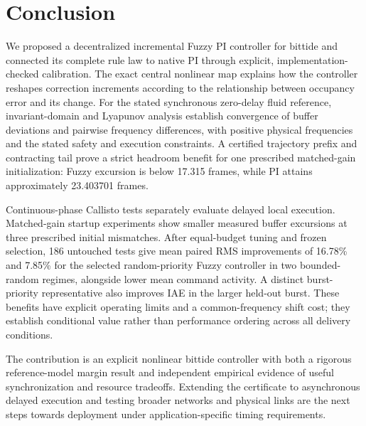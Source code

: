 \section{Conclusion}
\label{sec:conclusion}

We proposed a decentralized incremental Fuzzy PI controller for
bittide and connected its complete rule law to native PI through
explicit, implementation-checked calibration. The exact central
nonlinear map explains how the controller reshapes correction
increments according to the relationship between occupancy error
and its change. For the stated synchronous zero-delay fluid reference,
invariant-domain and Lyapunov analysis establish convergence of buffer
deviations and pairwise frequency differences, with positive physical
frequencies and the stated safety and execution constraints. A certified
trajectory prefix and contracting tail prove a strict headroom benefit
for one prescribed matched-gain initialization: Fuzzy excursion is
below 17.315 frames, while PI attains approximately 23.403701 frames.

Continuous-phase Callisto tests separately evaluate delayed local
execution. Matched-gain startup experiments show smaller measured
buffer excursions at three prescribed initial mismatches. After
equal-budget tuning and frozen selection, 186 untouched tests give
mean paired RMS improvements of 16.78\% and 7.85\% for the selected
random-priority Fuzzy controller in two bounded-random regimes,
alongside lower mean command activity. A distinct burst-priority
representative also improves IAE in the larger held-out burst.
These benefits have explicit operating limits and a common-frequency
shift cost; they establish conditional value rather than performance
ordering across all delivery conditions.

The contribution is an explicit nonlinear bittide controller with
both a rigorous reference-model margin result and independent
empirical evidence of useful synchronization and resource tradeoffs.
Extending the certificate to asynchronous delayed execution and
testing broader networks and physical links are the next steps
towards deployment under application-specific timing requirements.


